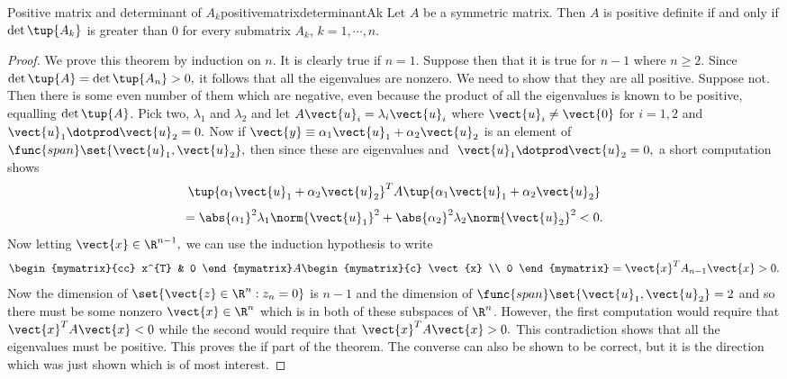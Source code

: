 \begin{theorem}{Positive matrix and determinant of $A_k$}{positivematrixdeterminantAk}   
Let $A$ be a symmetric matrix. Then $A$ is positive definite if
and only if $\det \tup{A_{k}}$ is greater than $0$ for every submatrix $A_{k}$,  $k=1,\cdots ,n$. 
\end{theorem}

\begin{proof}
We prove this theorem by induction on $n.$ It is clearly
true if $n=1.$ Suppose then that it is true for $n-1$ where $n\geq 2$. Since 
$\det \tup{A} =\det \tup{A_{n}} >0,$ it follows that all the
eigenvalues are nonzero. We need to show that they are all positive. Suppose
not. Then there is some even number of them which are negative, even because
the product of all the eigenvalues is known to be positive, equalling $\det
\tup{A} $. Pick two, $\lambda _{1}$ and $\lambda _{2}$ and let $A
\vect{u}_{i}=\lambda _{i}\vect{u}_{i}$ where $\vect{u}_{i}\neq \vect{0}$ for $
i=1,2$ and $\vect{u}_{1}\dotprod \vect{u}_{2}=0.$ Now if $\vect{y}\equiv \alpha
_{1}\vect{u}_{1}+\alpha _{2}\vect{u}_{2}$ is an element of $\func{span}\set{
\vect{u}_{1},\vect{u}_{2}} ,$ then since these are eigenvalues and $\ 
\vect{u}_{1}\dotprod \vect{u}_{2}=0,$ a short computation shows 
\begin{equation*}
\tup{\alpha _{1}\vect{u}_{1}+\alpha _{2}\vect{u}_{2}} ^{T}A\tup{
\alpha _{1}\vect{u}_{1}+\alpha _{2}\vect{u}_{2}}
\end{equation*}
\begin{equation*}
=\abs{\alpha _{1}}^{2}\lambda _{1}\norm{\vect{u}
_{1}} ^{2}+\abs{\alpha _{2}}^{2}\lambda
_{2}\norm{\vect{u}_{2}} ^{2}<0.
\end{equation*}
Now letting $\vect{x}\in \R^{n-1},$ we can use the induction
hypothesis to write 
\begin{equation*}
\begin{mymatrix}{cc}
x^{T} & 0
\end{mymatrix} A\begin{mymatrix}{c}
\vect{x} \\ 
0
\end{mymatrix} =\vect{x}^{T}A_{n-1}\vect{x}>0.
\end{equation*}
Now the dimension of $\set{\vect{z}\in \R^{n}:z_{n}=0} $ is 
$n-1$ and the dimension of $\func{span}\set{\vect{u}_{1},\vect{u}
_{2}} =2$ and so there must be some nonzero $\vect{x}\in \R
^{n} $ which is in both of these subspaces of $\R^{n}$. However, the
first computation would require that $\vect{x}^{T}A\vect{x}<0$ while the
second would require that $\vect{x}^{T}A\vect{x}>0.$ This contradiction shows
that all the eigenvalues must be positive. This proves the if part of the
theorem. The converse can also be shown to be correct, but it is the
direction which was just shown which is of most interest. 
\end{proof}

